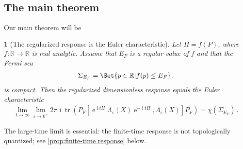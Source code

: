 \documentclass[a4paper,10pt]{article}
\numberwithin{equation}{section}
\theoremstyle{plain}
\newtheorem{thm}{\protect\theoremname}[section]
\theoremstyle{plain}
\theoremstyle{plain}
\theoremstyle{plain}
\theoremstyle{plain}
\theoremstyle{remark}
\theoremstyle{definition}
\theoremstyle{plain}
\providecommand{\theoremname}{Theorem}
\newcommand{\ee}{\operatorname{e}}
\newcommand{\ii}{\operatorname{i}}
\newcommand{\RR}{\mathbb{R}}
\newcommand{\tr}{\operatorname{tr}}
\newcommand{\ve}{\varepsilon}
\newcommand{\eql}[1]{\begin{align}#1\end{align}}
\begin{document}
    
    \subsection{The main theorem}


    Our main theorem will be 
    \begin{thm}[The regularized response is the Euler characteristic]\label{thm:main theorem}
        Let $H=f(P)$, where $f:\RR\to\RR$ is real analytic. Assume that $E_F$ is a regular value of $f$ and that the Fermi sea
        \eql{\label{eq:Fermi sea}\Sigma_{E_F}=\Set{p\in\RR | f(p)\leq E_F}\,.}
        is compact. Then the regularized dimensionless response equals the Euler characteristic
        \eql{\lim_{t\to\infty}\lim_{\ve\to0^+}
2\pi\ii\tr\left(
P_F\left[
\ee^{\ii tH}\Lambda_\ve(X)\ee^{-\ii tH},
\Lambda_\ve(X)
\right]P_F
\right)
=\chi(\Sigma_{E_F})\,.
\label{eq:linear response}}
        
    \end{thm}
The large-time limit is essential: the finite-time response is not
topologically quantized; see \cref{prop:finite-time response} below.
\end{document}
